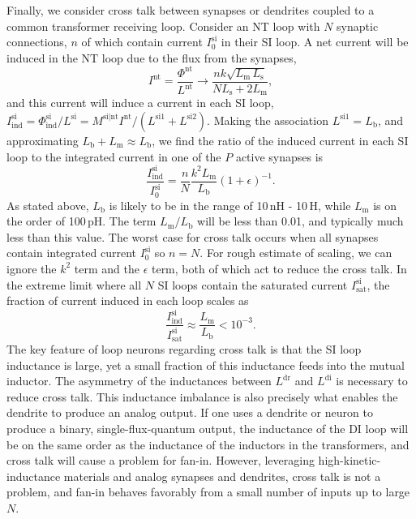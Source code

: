 \documentclass[twocolumn]{article}
\begin{document}
Finally, we consider cross talk between synapses or dendrites coupled to a common transformer receiving loop. Consider an NT loop with $N$ synaptic connections, $n$ of which contain current $I^{\mathrm{si}}_0$ in their SI loop. A net current will be induced in the NT loop due to the flux from the synapses,
\begin{equation}
\label{eq:fan-in__transformer_collection__I_nt}
I^{\mathrm{nt}} = \frac{\Phi^{\mathrm{nt}}}{L^{\mathrm{nt}}}\rightarrow \frac{ n k \sqrt{L_{\mathrm{m}}\,L_{\mathrm{s}}}}{NL_{\mathrm{s}}+2L_{\mathrm{m}}},
\end{equation}
and this current will induce a current in each SI loop, $I^{\mathrm{si}}_{\mathrm{ind}} = \Phi^{\mathrm{si}}_{\mathrm{ind}}/L^{\mathrm{si}} = M^{\mathrm{si|nt}}I^{\mathrm{nt}}/(L^{\mathrm{si1}}+L^{\mathrm{si2}})$. Making the association $L^{\mathrm{si1}} = L_{\mathrm{b}}$, and approximating $L_{\mathrm{b}} + L_{\mathrm{m}} \approx L_{\mathrm{b}}$, we find the ratio of the induced current in each SI loop to the integrated current in one of the $P$ active synapses is
\begin{equation}
\label{eq:fan-in__transformer_collection__cross_talk}
\frac{I^{\mathrm{si}}_{\mathrm{ind}}}{I^{\mathrm{si}}_0} = \frac{n}{N}\frac{k^2L_{\mathrm{m}}}{L_{\mathrm{b}}}\left( 1+\epsilon \right)^{-1}.
\end{equation}
As stated above, $L_{\mathrm{b}}$ is likely to be in the range of 10\,nH - 10\,\textmu H, while $L_{\mathrm{m}}$ is on the order of 100\,pH. The term $L_{\mathrm{m}}/L_{\mathrm{b}}$ will be less than 0.01, and typically much less than this value. The worst case for cross talk occurs when all synapses contain integrated current $I^{\mathrm{si}}_0$ so $n = N$. For rough estimate of scaling, we can ignore the $k^2$ term and the $\epsilon$ term, both of which act to reduce the cross talk. In the extreme limit where all $N$ SI loops contain the saturated current $I^{\mathrm{si}}_{\mathrm{sat}}$, the fraction of current induced in each loop scales as
\begin{equation}
\label{eq:fan-in__transformer_collection__cross_talk__worst_case}
\frac{I^{\mathrm{si}}_{\mathrm{ind}}}{I^{\mathrm{si}}_{\mathrm{sat}}} \approx \frac{L_{\mathrm{m}}}{L_{\mathrm{b}}} < 10^{-3}.
\end{equation}
The key feature of loop neurons regarding cross talk is that the SI loop inductance is large, yet a small fraction of this inductance feeds into the mutual inductor. The asymmetry of the inductances between $L^{\mathrm{dr}}$ and $L^{\mathrm{di}}$ is necessary to reduce cross talk. This inductance imbalance is also precisely what enables the dendrite to produce an analog output. If one uses a dendrite or neuron to produce a binary, single-flux-quantum output, the inductance of the DI loop will be on the same order as the inductance of the inductors in the transformers, and cross talk will cause a problem for fan-in. However, leveraging high-kinetic-inductance materials and analog synapses and dendrites, cross talk is not a problem, and fan-in behaves favorably from a small number of inputs up to large $N$.



\end{document}
